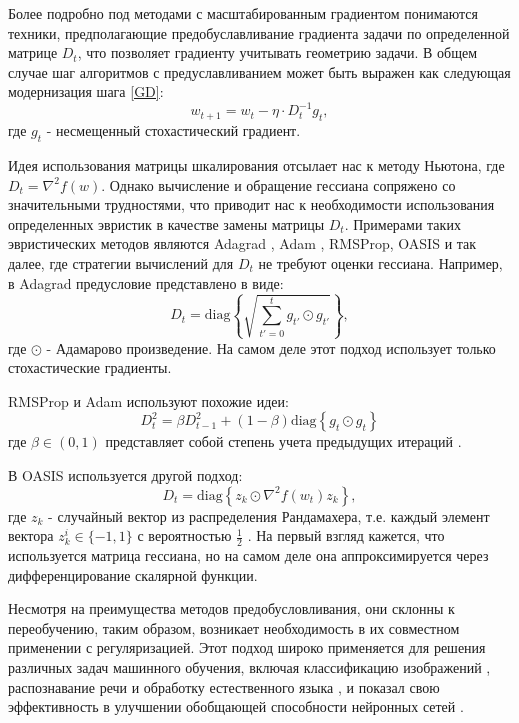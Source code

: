 Более подробно под методами с масштабированным градиентом понимаются техники, предполагающие предобуславливание градиента задачи по определенной матрице $D_t$, что позволяет градиенту учитывать геометрию задачи. В общем случае шаг алгоритмов с предуславливанием может быть выражен как следующая модернизация шага \eqref{GD}:
\begin{equation}
    w_{t+1} = w_t - \eta \cdot D_t^{-1} g_t,
\end{equation}
где $g_t$ - несмещенный стохастический градиент.

Идея использования матрицы шкалирования отсылает нас к методу Ньютона, где $D_t = \nabla^2 f(w)$. Однако вычисление и обращение гессиана сопряжено со значительными трудностями, что приводит нас к необходимости использования определенных эвристик в качестве замены матрицы $D_t$. Примерами таких эвристических методов являются Adagrad \citep{duchi2011adaptive}, Adam \citep{kingma2014adam}, RMSProp, OASIS \citep{goldberg2011oasis} и так далее, где стратегии вычислений для $D_t$ не требуют оценки гессиана.
Например, в Adagrad предусловие представлено в виде:
$$ D_t = \text{diag} \left\{ \sqrt{\sum_{t'=0}^t{g_{t'} \odot g_{t'}}} \right\}, $$
где $\odot$ - Адамарово произведение.  На самом деле этот подход использует только стохастические градиенты.

RMSProp и Adam используют похожие идеи:
$$ D_t^2 = \beta D_{t-1}^2 + (1 - \beta) \text{diag} \left\{ g_{t} \odot g_{t} \right\} $$
где $\beta \in (0, 1)$ представляет собой степень учета предыдущих итераций \citep{kingma2014adam}.

В OASIS используется другой подход:
$$ D_t = \text{diag} \left\{ z_k \odot \nabla^2 f(w_t) z_k \right\}, $$
где $z_k$ - случайный вектор из распределения Рандамахера, т.е. каждый элемент вектора $z_k^i \in \{-1, 1\}$ с вероятностью $\frac{1}{2}$ \citep{goldberg2011oasis}. На первый взгляд кажется, что используется матрица гессиана, но на самом деле она аппроксимируется через дифференцирование скалярной функции.

Несмотря на преимущества методов предобусловливания, они склонны к переобучению, таким образом, возникает необходимость в их совместном применении с регуляризацией. Этот подход широко применяется для решения различных задач машинного обучения, включая классификацию изображений \citep{zhu2017learning}, распознавание речи \citep{zhou2017improved} и обработку естественного языка \citep{wu2022stgn}, и показал свою эффективность в улучшении обобщающей способности нейронных сетей \citep{girosi1995regularization}. 

